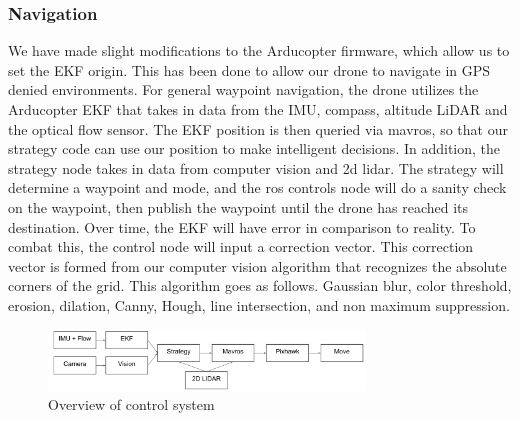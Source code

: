 \documentclass[12pt,letterpaper]{article}
\begin{document}
		\subsubsection*{Navigation}
			We have made slight modifications to the Arducopter firmware, which allow us to set the EKF origin. This has been done to allow our drone to navigate in GPS denied environments. For general waypoint navigation, the drone utilizes the Arducopter EKF that takes in data from the IMU, compass, altitude LiDAR and the optical flow sensor. The EKF position is then queried via mavros, so that our strategy code can use our position to make intelligent decisions. In addition, the strategy node takes in data from computer vision and 2d lidar. The strategy will determine a waypoint and mode, and the ros controls node will do a sanity check on the waypoint, then publish the waypoint until the drone has reached its destination. Over time, the EKF will have error in comparison to reality. To combat this, the control node will input a correction vector. This correction vector is formed from our computer vision algorithm that recognizes the absolute corners of the grid. This algorithm goes as follows. Gaussian blur, color threshold, erosion, dilation, Canny, Hough, line intersection, and non maximum suppression.

		\begin{figure}[!htbp]
			\begin{center}
				\includegraphics[width=0.75\textwidth]{system}
				\caption*{Overview of control system}
			\end{center}
		\end{figure}

\end{document}
